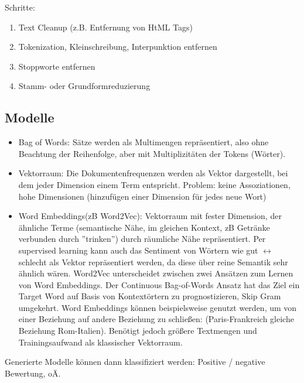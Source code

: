 \documentclass{article}
\begin{document}
Schritte:
\begin{enumerate}
    \item Text Cleanup (z.B. Entfernung von HtML Tags)
    \item Tokenization, Kleinschreibung, Interpunktion entfernen
    \item Stoppworte entfernen
    \item Stamm- oder Grundformreduzierung
\end{enumerate}

\subsection{Modelle}
\begin{itemize}
    \item Bag of Words: Sätze werden als Multimengen repräsentiert, also ohne Beachtung der Reihenfolge, aber mit Multiplizitäten der Tokens (Wörter).
    \item Vektorraum: Die Dokumentenfrequenzen werden als Vektor dargestellt, bei dem jeder Dimension einem Term entspricht.
        Problem: keine Assoziationen, hohe Dimensionen (hinzufügen einer Dimension für jedes neue Wort)
    \item Word Embeddings(zB Word2Vec): Vektorraum mit fester Dimension, der ähnliche Terme (semantische Nähe, im gleichen Kontext, zB Getränke verbunden durch ''trinken'')
        durch räumliche Nähe repräsentiert.
        Per supervised learning kann auch das Sentiment von Wörtern wie gut $\leftrightarrow$  schlecht als Vektor repräsentiert werden, 
        da diese über reine Semantik sehr ähnlich wären. 
        Word2Vec unterscheidet zwischen zwei Ansätzen zum Lernen von Word Embeddings. 
        Der Continuous Bag-of-Words Ansatz hat das Ziel ein Target Word auf Basis von Kontextörtern zu prognostizieren, Skip Gram umgekehrt. 
        Word Embeddings können beispielsweise genutzt werden, um von einer Beziehung auf andere Beziehung zu schließen: (Paris-Frankreich gleiche Beziehung Rom-Italien).
        Benötigt jedoch größere Textmengen und Trainingsaufwand als klassischer Vektorraum.
\end{itemize}
Generierte Modelle können dann klassifiziert werden: Positive / negative Bewertung, oÄ.
\end{document}
